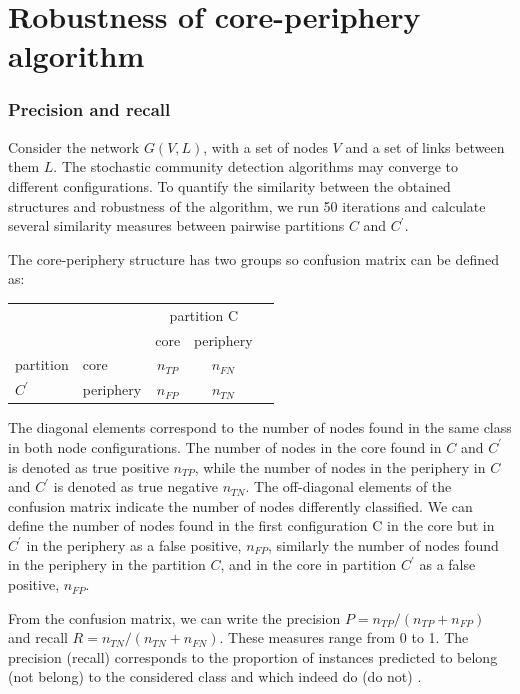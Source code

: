 \chapter{Robustness of core-periphery algorithm} %
\subsection{Precision and recall}
Consider the network $G(V, L)$, with a set of nodes $V$ and a set of links between them $L$. The stochastic community detection algorithms may converge to different configurations. To quantify the similarity between the obtained structures and robustness of the algorithm, we run 50 iterations and calculate several similarity measures between pairwise partitions $C$ and $C^{'}$.

The core-periphery structure has two groups so confusion matrix \cite{labatut2012accuracy} can be defined as:

\begin{center}
	
	\begin{tabular}{l|l|c|c|c} 
		
		\multicolumn{2}{c}{}&\multicolumn{2}{c}{partition C}&\\ 
		
		\cline{3-4} 
		\multicolumn{2}{c|}{}&core&periphery&\multicolumn{1}{c}{}\\
		\cline{2-4} 
		partition & core & $n_{TP}$ & $n_{FN}$ & \\ 
		\cline{2-4} $C^{'}$ & periphery & $n_{FP}$ & $n_{TN}$ & \\ 
		\cline{2-4}
	\end{tabular}
\end{center}


The diagonal elements correspond to the number of nodes found in the same class in both node configurations. The number of nodes in the core found in $C$ and $C^{'}$ is denoted as true positive $n_{TP}$, while the number of nodes in the periphery in $C$ and $C^{'}$ is denoted as true negative $n_{TN}$. The off-diagonal elements of the confusion matrix indicate the number of nodes differently classified. We can define the number of nodes found in the first configuration C in the core but in $C^{'}$ in the periphery as a false positive, $n_{FP}$, similarly the number of nodes found in the periphery in the partition $C$, and in the core in partition $C^{'}$ as a false positive, $n_{FP}$. 

From the confusion matrix, we can write the precision $P =n_{TP}/(n_{TP}+n_{FP})$ and recall $R=n_{TN}/(n_{TN}+n_{FN})$. These measures range from 0 to 1. The precision (recall) corresponds to the proportion of instances predicted to belong (not belong) to the considered class and which indeed do (do not) \cite{labatut2012accuracy}. \\~\\

